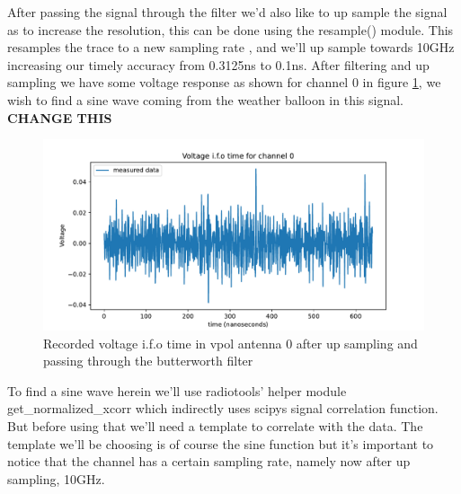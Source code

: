 After passing the signal through the filter we'd also like to up sample the
signal as to increase the resolution, this can be done using the resample() module. This resamples the trace to a new sampling rate
, and we'll up sample towards 10GHz increasing our timely accuracy from
0.3125ns to 0.1ns.  After filtering and up sampling we have some voltage
response as shown for channel 0 in figure \ref{fig:VoltageAfterFilter}, we wish
to find a sine wave coming from the weather balloon in this signal.
\textbf{CHANGE THIS}
\begin{figure}
	\centering
	\includegraphics[width=\textwidth]{figures/VoltageAfterFilter.pdf}
	\caption{Recorded voltage i.f.o time in vpol antenna 0 after up sampling and passing through the butterworth filter}
	\label{fig:VoltageAfterFilter}
\end{figure}

To find a sine wave herein we'll use radiotools' helper module get\_normalized\_xcorr
which indirectly uses scipys signal correlation function. But before using that we'll
need a template to correlate with the data. The template we'll be choosing is
of course the sine function but it's important to notice that the channel has a
certain sampling rate, namely now after up sampling, 10GHz. 

